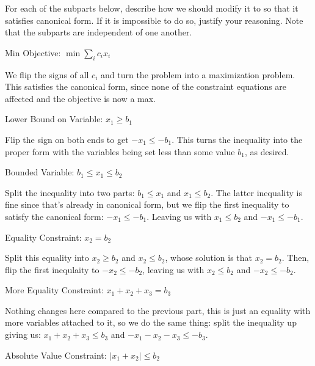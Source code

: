 \documentclass[11pt]{article}
\begin{document}
\noindent For each of the subparts below, describe how we should modify it to so that it satisfies canonical form. If it is impossible to do so, justify your reasoning. Note that the subparts are independent of one another.
\begin{subparts}
  \subpart Min Objective: $\min \sum_i c_i x_i$

  \begin{solution}
  	We flip the signs of all \(c_i\) and turn the problem into a maximization problem. This satisfies the 
	canonical form, since none of the constraint equations are affected and the objective is now a max.  
  \end{solution}
  \subpart Lower Bound on Variable: $x_1 \geq b_1$

  \begin{solution}
  	Flip the sign on both ends to get \(-x_1 \le -b_1\). This turns the inequality into the proper 
	form with the variables being set less than some value \(b_1\), as desired. 
  \end{solution}
\subpart Bounded Variable: $b_1 \leq x_1 \leq b_2$

\begin{solution}
	Split the inequality into two parts: \(b_1 \le x_1\) and \(x_1 \le  b_2\). The latter inequality is fine 
	since that's already in canonical form, but we flip the first inequality to satisfy the canonical form: 
	\(-x_1 \le  -b_1\). Leaving us with \(x_1 \le  b_2\) and \(-x_1 \le  -b_1\). 
\end{solution}
  \subpart Equality Constraint: $x_2 = b_2$

  \begin{solution}
  	Split this equality into \(x_2 \ge  b_2\) and \(x_2 \le  b_2\), whose solution is that \(x_2 = b_2\). Then, 
	flip the first inequlaity to \(-x_2 \le  -b_2\), leaving us with \(x_2 \le  b_2\) and \(-x_2 \le  -b_2\). 
  \end{solution}
  \subpart More Equality Constraint: $x_1 + x_2 + x_3 = b_3$

  \begin{solution}
	  Nothing changes here compared to the previous part, this is just an equality with more variables 
	  attached to it, so we do the same thing: split the inequality up giving us: \(x_1 + x_2 + x_3 \le  b_3\)
	  and \(-x_1 - x_2 - x_3 \le  -b_3\). 
  \end{solution}
    \subpart Absolute Value Constraint: $|x_1+x_2| \leq b_2$


\end{subparts}
\end{document}

